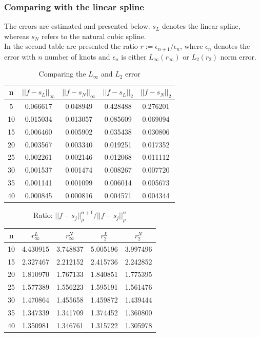 \documentclass[12pt]{article}
\begin{document}
\subsubsection{Comparing with the linear spline}
The errors are estimated and presented below. $s_L$ denotes the linear spline, whereas $s_N$ refers to the natural cubic spline.\\
In the second table are presented the ratio $r := \epsilon_{n+1}/\epsilon_n$, where $\epsilon_n$ denotes the error with $n$ number of knots and $\epsilon_n$ is either $L_\infty (r_\infty)$ or $L_2(r_2)$ norm error.
\begin{table}[ht]
    \centering
    \begin{tabular}{|c|c|c|c|c|}
        \hline
        n & $||f-s_L||_\infty$ & $||f-s_N||_\infty$
        & $||f-s_L||_2$ & $||f-s_N||_2$\\
        \hline 
        \hline
        5 & 0.066617 & 0.048949 & 0.428488 & 0.276201\\
        \hline
        10 & 0.015034 & 0.013057 & 0.085609 & 0.069094\\
        \hline
        15 & 0.006460 & 0.005902 & 0.035438 & 0.030806\\
        \hline
        20 & 0.003567 & 0.003340 & 0.019251 & 0.017352\\
        \hline
        25 & 0.002261 & 0.002146 & 0.012068 & 0.011112\\
        \hline
        30 & 0.001537 & 0.001474 & 0.008267 & 0.007720\\
        \hline
        35 & 0.001141 & 0.001099 & 0.006014 & 0.005673\\
        \hline
        40 & 0.000845 & 0.000816 & 0.004571 & 0.004344\\
        \hline
    \end{tabular}
    \caption{Comparing the $L_\infty$ and $L_2$ error}
\end{table}
\begin{table}[h]
    \centering
    \begin{tabular}{|c|c|c|c|c|}
    \hline
        n & $r^L_\infty$ & $r^N_\infty$ & $r^L_2$ & $r^N_2$ \\
        \hline \hline
        10 & 4.430915 & 3.748837 & 5.005196 & 3.997496\\
        \hline
        15 & 2.327467 & 2.212152 & 2.415736 & 2.242852\\
        \hline
        20 & 1.810970 & 1.767133 & 1.840851 & 1.775395\\
        \hline
        25 & 1.577389 & 1.556223 & 1.595191 & 1.561476\\
        \hline
        30 & 1.470864 & 1.455658 & 1.459872 & 1.439444\\
        \hline
        35 & 1.347339 & 1.341709 & 1.374452 & 1.360800\\
        \hline
        40 & 1.350981 & 1.346761 & 1.315722 & 1.305978\\
        \hline
    \end{tabular}
    \caption{Ratio: $||f-s_j||^{n+1}_\rho/||f-s_j||^n_\rho$}
    \label{tab:my_label}
\end{table}
\end{document}
